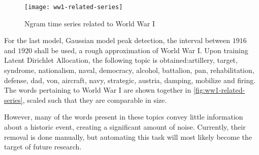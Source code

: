 \begin{figure}
\centering
\texttt{[image: ww1-related-series]}
\caption{Ngram time series related to World War I}
\label{fig:ww1-related-series}
\end{figure}

For the last model, Gaussian model peak detection, the interval between $1916$ and $1920$ shall be used, a rough approximation of World War I. Upon training Latent Dirichlet Allocation, the following topic is obtained:artillery, target, syndrome, nationalism, naval, democracy, alcohol, battalion, pan, rehabilitation, defense, dad, von, aircraft, navy, strategic, austria, damping, mobilize and firing. The words pertaining to World War I are shown together in \autoref{fig:ww1-related-series}, scaled such that they are comparable in size.

However, many of the words present in these topics convey little information about a historic event, creating a significant amount of noise. Currently, their removal is done manually, but automating this task will most likely become the target of future research.
